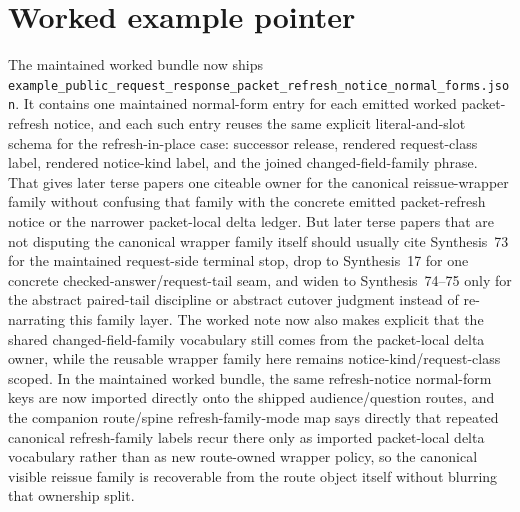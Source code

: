 \documentclass[11pt]{article}
\begin{document}
\section{Worked example pointer}
The maintained worked bundle now ships \nolinkurl{example_public_request_response_packet_refresh_notice_normal_forms.json}.\cite{series:workedexample}
It contains one maintained normal-form entry for each emitted worked packet-refresh notice, and each such entry reuses the same explicit literal-and-slot schema for the refresh-in-place case: successor release, rendered request-class label, rendered notice-kind label, and the joined changed-field-family phrase.
That gives later terse papers one citeable owner for the canonical reissue-wrapper family without confusing that family with the concrete emitted packet-refresh notice or the narrower packet-local delta ledger. But later terse papers that are not disputing the canonical wrapper family itself should usually cite Synthesis~73 for the maintained request-side terminal stop, drop to Synthesis~17 for one concrete checked-answer/request-tail seam, and widen to Synthesis~74--75 only for the abstract paired-tail discipline or abstract cutover judgment instead of re-narrating this family layer. The worked note now also makes explicit that the shared changed-field-family vocabulary still comes from the packet-local delta owner, while the reusable wrapper family here remains notice-kind/request-class scoped. In the maintained worked bundle, the same refresh-notice normal-form keys are now imported directly onto the shipped audience/question routes, and the companion route/spine refresh-family-mode map says directly that repeated canonical refresh-family labels recur there only as imported packet-local delta vocabulary rather than as new route-owned wrapper policy, so the canonical visible reissue family is recoverable from the route object itself without blurring that ownership split.
\end{document}
